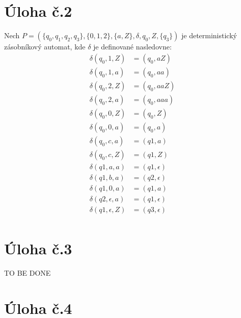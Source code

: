 \documentclass[11pt]{article}
\begin{document}
\section*{Úloha č.2}
    Nech $P = (\{q_0, q_1, q_2, q_3\}, \{0,1,2\}, \{a,Z\}, \delta, q_0, Z, \{q_3\})$ je deterministický zásobníkový automat, kde
    $\delta$ je definované nasledovne:
    \begin{align*}
        \delta (q_0, 1, Z) &= (q_0, aZ)\\
        \delta (q_0, 1, a) &= (q_0, aa)\\
        \delta (q_0, 2, Z) &= (q_0, aaZ)\\
        \delta (q_0, 2, a) &= (q_0, aaa)\\
        \delta (q_0, 0, Z) &= (q_0, Z)\\
        \delta (q_0, 0, a) &= (q_0, a)\\
        \delta (q_0, c, a) &= (q1, a)\\
        \delta (q_0, c, Z) &= (q1, Z)\\
        \delta (q1, a, a) &= (q1, \epsilon)\\
        \delta (q1, b, a) &= (q2, \epsilon)\\
        \delta (q1, 0, a) &= (q1, a)\\
        \delta (q2, \epsilon, a) &= (q1, \epsilon)\\
        \delta (q1, \epsilon, Z) &= (q3, \epsilon)\\
    \end{align*}


\section*{Úloha č.3}
TO BE DONE

\section*{Úloha č.4}
\end{document}
